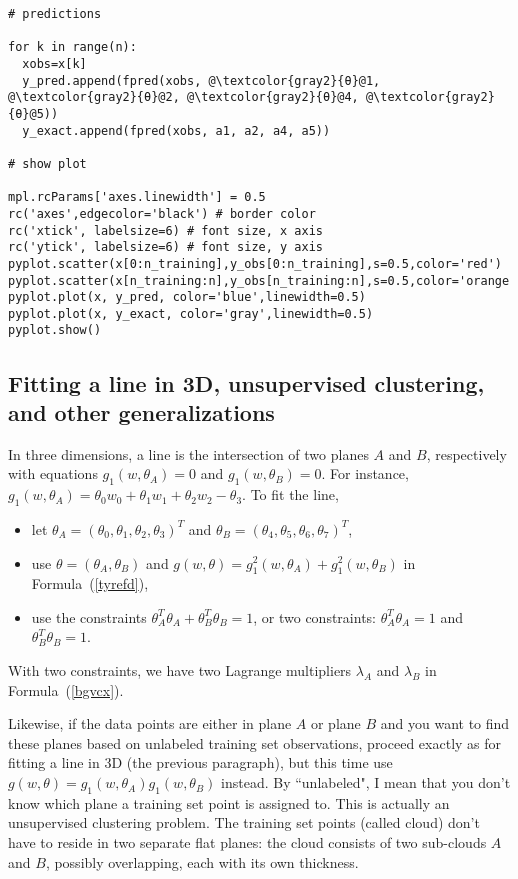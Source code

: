 \documentclass[oneside,10pt]{book}
\begin{document}
\begin{lstlisting}[escapechar=@]
# predictions  

for k in range(n):
  xobs=x[k]
  y_pred.append(fpred(xobs, @\textcolor{gray2}{θ}@1, @\textcolor{gray2}{θ}@2, @\textcolor{gray2}{θ}@4, @\textcolor{gray2}{θ}@5))
  y_exact.append(fpred(xobs, a1, a2, a4, a5)) 

# show plot

mpl.rcParams['axes.linewidth'] = 0.5
rc('axes',edgecolor='black') # border color
rc('xtick', labelsize=6) # font size, x axis 
rc('ytick', labelsize=6) # font size, y axis
pyplot.scatter(x[0:n_training],y_obs[0:n_training],s=0.5,color='red')
pyplot.scatter(x[n_training:n],y_obs[n_training:n],s=0.5,color='orange')
pyplot.plot(x, y_pred, color='blue',linewidth=0.5)
pyplot.plot(x, y_exact, color='gray',linewidth=0.5)
pyplot.show()
\end{lstlisting}

\subsection{Fitting a line in 3D, unsupervised clustering, and other generalizations}

In three dimensions, a line is the intersection of two planes $A$ and $B$, respectively with equations
$g_1(w,\theta_A)=0$ and $g_1(w,\theta_B)=0$. For instance, $g_1(w,\theta_A)=\theta_0 w_0 + \theta_1 w_1 +\theta_2 w_2 
- \theta_3$. To fit the line, \vspace{1ex}
\begin{itemize}
\item let $\theta_A=(\theta_0,\theta_1,\theta_2,\theta_3)^T$ and $\theta_B=(\theta_4,\theta_5,\theta_6,\theta_7)^T$, 
\item use $\theta=(\theta_A,\theta_B)$ and $g(w,\theta)=g_1^2(w,\theta_A)+g_1^2(w,\theta_B)$ in Formula~(\ref{tyrefd}), 
\item use the constraints  $\theta_A^T\theta_A + \theta_B^T\theta_B=1$, or two constraints: $\theta_A^T\theta_A=1$ and $\theta_B^T\theta_B=1$. 
\end{itemize}
 With two constraints, we have two 
Lagrange multipliers $\lambda_A$ and $\lambda_B$ in Formula~(\ref{bgvcx}).

Likewise, if the data points are either in plane $A$ or plane $B$ and you want to find these planes based on unlabeled training set observations, proceed exactly as for fitting a line in 3D (the
 previous paragraph), but this time use $g(w,\theta)=g_1(w,\theta_A)g_1(w,\theta_B)$ instead. By ``unlabeled", I mean that you don't know which plane a training set point is assigned to.   This is actually an unsupervised clustering problem. The \textcolor{index}{training set} points (called cloud) don't have to reside 
 in two separate flat planes: the cloud consists of two sub-clouds $A$ and $B$, possibly overlapping, each with its own thickness.
\end{document}
